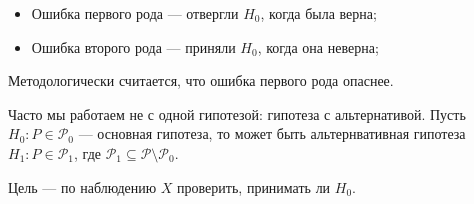 \begin{itemize}
    \item Ошибка первого рода --- отвергли \(H_0\), когда была верна;
    \item Ошибка второго рода --- приняли \(H_0\), когда она неверна;
\end{itemize}

Методологически считается, что ошибка первого рода опаснее.

Часто мы работаем не с одной гипотезой: гипотеза с альтернативой. Пусть \(H_0 : P \in \mathcal{P}_0\) --- основная гипотеза, то может быть альтернвативная гипотеза \(H_1 : P \in \mathcal{P}_1\), где \(\mathcal{P}_1 \subseteq \mathcal{P} \setminus \mathcal{P}_0\).

Цель --- по наблюдению \(X\) проверить, принимать ли \(H_0\).
